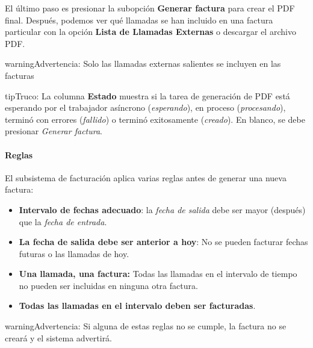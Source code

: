 \documentclass[letterpaper,10pt,spanish]{sphinxmanual}
\begin{document}
El último paso es presionar la subopción \textbf{Generar factura} para crear el PDF final. Después, podemos ver qué llamadas se han incluido en una factura particular con la opción \textbf{Lista de Llamadas Externas} o descargar el archivo PDF.

\begin{notice}{warning}{Advertencia:}
Solo las llamadas externas salientes se incluyen en las facturas
\end{notice}

\begin{notice}{tip}{Truco:}
La columna \textbf{Estado} muestra si la tarea de generación de PDF está esperando por el trabajador asíncrono (\emph{esperando}), en proceso (\emph{procesando}), terminó con errores (\emph{fallido}) o terminó exitosamente (\emph{creado}). En blanco, se debe presionar \emph{Generar factura}.
\end{notice}


\paragraph{Reglas}
\label{administration_portal/brand/invoicing/invoices:rules}
El subsistema de facturación aplica varias reglas antes de generar una nueva factura:
\begin{itemize}
\item {} 
\textbf{Intervalo de fechas adecuado}: la \emph{fecha de salida} debe ser mayor (después) que la \emph{fecha de entrada}.

\item {} 
\textbf{La fecha de salida debe ser anterior a hoy}: No se pueden facturar fechas futuras o las llamadas de hoy.

\item {} 
\textbf{Una llamada, una factura:} Todas las llamadas en el intervalo de tiempo no pueden ser incluidas en ninguna otra factura.

\item {} 
\textbf{Todas las llamadas en el intervalo deben ser facturadas}.

\end{itemize}

\begin{notice}{warning}{Advertencia:}
Si alguna de estas reglas no se cumple, la factura no se creará y el sistema advertirá.
\end{notice}
\end{document}
